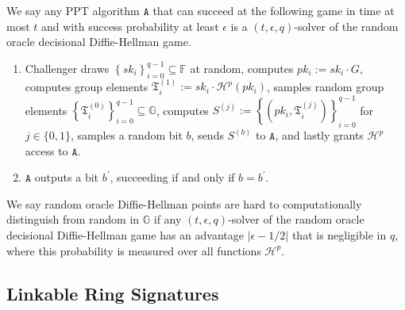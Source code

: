 \documentclass{llncs}
\begin{document}
\begin{definition}\label{def:rom-ddh}

We say any PPT algorithm $\texttt{A}$ that can succeed at the following game in time at most $t$ and with success probability at least $\epsilon$ is a $(t, \epsilon, q)$-solver of the random oracle decisional Diffie-Hellman game.
\begin{enumerate}
\item Challenger draws $\left\{sk_i\right\}_{i=0}^{q-1} \subseteq \mathbb{F}$ at random, computes $pk_i := sk_i \cdot G$, computes group elements $\mathfrak{T}^{(1)}_i := sk_i \cdot \mathcal{H}^p(pk_i)$, samples random group elements $\left\{\mathfrak{T}^{(0)}_i\right\}_{i=0}^{q-1} \subseteq \mathbb{G}$, computes $S^{(j)} := \left\{(pk_i, \mathfrak{T}^{(j)}_i)\right\}_{i=0}^{q-1}$ for $j \in \{0,1\}$, samples a random bit $b$, sends $S^{(b)}$ to $\texttt{A}$, and lastly grants $\mathcal{H}^p$ access to $\texttt{A}$.

\item $\texttt{A}$ outputs a bit $b^\prime$, succeeding if and only if $b = b^\prime$.
\end{enumerate}

We say random oracle Diffie-Hellman points are hard to computationally distinguish from random in $\mathbb{G}$ if any $(t, \epsilon, q)$-solver of the random oracle decisional Diffie-Hellman game has an advantage $\left|\epsilon - 1/2\right|$ that is negligible in $q$, where this probability is measured over all functions $\mathcal{H}^p$.
\end{definition}


\subsection{Linkable Ring Signatures}
\end{document}
